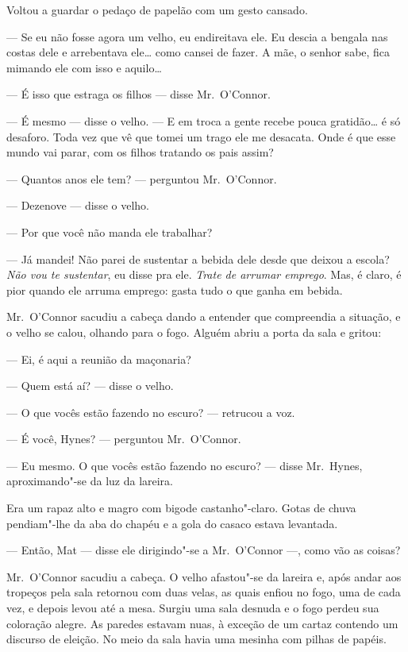 Voltou a guardar o pedaço de papelão com um gesto cansado.

--- Se eu não fosse agora um velho, eu endireitava ele.  Eu descia a bengala
nas costas dele e arrebentava ele\ldots{} como cansei de fazer.  A mãe, o
senhor sabe, fica mimando ele com isso e aquilo\ldots{}

--- É isso que estraga os filhos --- disse Mr.~O’Connor.

--- É mesmo --- disse o velho.  --- E em troca a gente recebe pouca
gratidão\ldots{} é só desaforo.  Toda vez que vê que tomei um trago ele me
desacata.  Onde é que esse mundo vai parar, com os filhos tratando os pais
assim?

--- Quantos anos ele tem? --- perguntou Mr.~O’Connor.

--- Dezenove --- disse o velho.

--- Por que você não manda ele trabalhar?

--- Já mandei!  Não parei de sustentar a bebida dele desde que deixou a escola?
\textit{Não vou te sustentar}, eu disse pra ele.  \textit{Trate de arrumar
emprego}.  Mas, é claro, é pior quando ele arruma emprego: gasta tudo o que
ganha em bebida.

Mr.~O’Connor sacudiu a cabeça dando a entender que compreendia a situação, e o
velho se calou, olhando para o fogo.  Alguém abriu a porta da sala e gritou:

--- Ei, é aqui a reunião da maçonaria?

--- Quem está aí? --- disse o velho.

--- O que vocês estão fazendo no escuro? --- retrucou a voz.

--- É você, Hynes? --- perguntou Mr.~O’Connor.

--- Eu mesmo.  O que vocês estão fazendo no escuro? --- disse Mr.~Hynes,
aproximando"-se da luz da lareira.

Era um rapaz alto e magro com bigode castanho"-claro.  Gotas de chuva
pendiam"-lhe da aba do chapéu e a gola do casaco estava levantada.

--- Então, Mat --- disse ele dirigindo"-se a Mr.~O’Connor ---, como vão as
coisas?

Mr.~O’Connor sacudiu a cabeça.  O velho afastou"-se da lareira e, após andar aos
tropeços pela sala retornou com duas velas, as quais enfiou no fogo, uma de
cada vez, e depois levou até a mesa.  Surgiu uma sala desnuda e o fogo perdeu
sua coloração alegre.  As paredes estavam nuas, à exceção de um cartaz contendo
um discurso de eleição.  No meio da sala havia uma mesinha com pilhas de
papéis.

